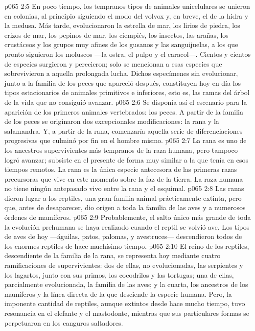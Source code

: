 \vs p065 2:5 En poco tiempo, los tempranos tipos de animales unicelulares se unieron en colonias, al principio siguiendo el modo del volvox y, en breve, el de la hidra y la medusa. Más tarde, evolucionaron la estrella de mar, los lirios de piedra, los erizos de mar, los pepinos de mar, los ciempiés, los insectos, las arañas, los crustáceos y los grupos muy afines de los gusanos y las sanguijuelas, a los que pronto siguieron los moluscos ---la ostra, el pulpo y el caracol---. Cientos y cientos de especies surgieron y perecieron; solo se mencionan a esas especies que sobrevivieron a aquella prolongada lucha. Dichos especímenes sin evolucionar, junto a la familia de los peces que apareció después, constituyen hoy en día los tipos estacionarios de animales primitivos e inferiores, esto es, las ramas del árbol de la vida que no consiguió avanzar.
\vs p065 2:6 \pc Se disponía así el escenario para la aparición de los primeros animales vertebrados: los peces. A partir de la familia de los peces se originaron dos excepcionales modificaciones: la rana y la salamandra. Y, a partir de la rana, comenzaría aquella serie de diferenciaciones progresivas que culminó por fin en el hombre mismo.
\vs p065 2:7 La rana es uno de los ancestros supervivientes más tempranos de la raza humana, pero tampoco logró avanzar; subsiste en el presente de forma muy similar a la que tenía en esos tiempos remotos. La rana es la única especie antecesora de las primeras razas precursoras que vive en este momento sobre la faz de la tierra. La raza humana no tiene ningún antepasado vivo entre la rana y el esquimal.
\vs p065 2:8 \pc Las ranas dieron lugar a los reptiles, una gran familia animal prácticamente extinta, pero que, antes de desaparecer, dio origen a toda la familia de las aves y a numerosos órdenes de mamíferos.
\vs p065 2:9 Probablemente, el salto único más grande de toda la evolución prehumana se haya realizado cuando el reptil se volvió ave. Los tipos de aves de hoy ---águilas, patos, palomas, y avestruces--- descendieron todos de los enormes reptiles de hace muchísimo tiempo.
\vs p065 2:10 El reino de los reptiles, descendiente de la familia de la rana, se representa hoy mediante cuatro ramificaciones de supervivientes: dos de ellas, no evolucionadas, las serpientes y los lagartos, junto con sus primos, los cocodrilos y las tortugas; una de ellas, parcialmente evolucionada, la familia de las aves; y la cuarta, los ancestros de los mamíferos y la línea directa de la que desciende la especie humana. Pero, la imponente cantidad de reptiles, aunque extintos desde hace mucho tiempo, tuvo resonancia en el elefante y el mastodonte, mientras que sus particulares formas se perpetuaron en los canguros saltadores.
